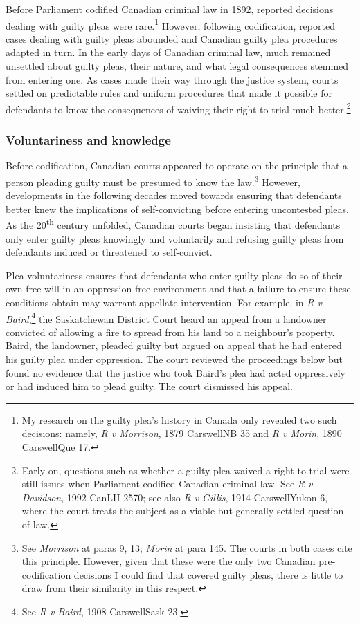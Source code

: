 Before Parliament codified Canadian criminal law in 1892, reported decisions dealing with guilty pleas were rare.\footnote{My research on the guilty plea's history in Canada only revealed two such decisions: namely, \textit{R v Morrison}, 1879 CarswellNB 35 and \textit{R v Morin}, 1890 CarswellQue 17.} However, following codification, reported cases dealing with guilty pleas abounded and Canadian guilty plea procedures adapted in turn. In the early days of Canadian criminal law, much remained unsettled about guilty pleas, their nature, and what legal consequences stemmed from entering one. As cases made their way through the justice system, courts settled on predictable rules and uniform procedures that made it possible for defendants to know the consequences of waiving their right to trial much better.\footnote{Early on, questions such as whether a guilty plea waived a right to trial were still issues when Parliament codified Canadian criminal law. See \textit{R v Davidson}, 1992 CanLII 2570; see also \textit{R v Gillis}, 1914 CarswellYukon 6, where the court treats the subject as a viable but generally settled question of law.}

\subsubsection{Voluntariness and knowledge}

Before codification, Canadian courts appeared to operate on the principle that a person pleading guilty must be presumed to know the law.\footnote{See \textit{Morrison} at paras 9, 13; \textit{Morin} at para 145. The courts in both cases cite this principle. However, given that these were the only two Canadian pre-codification decisions I could find that covered guilty pleas, there is little to draw from their similarity in this respect.} However, developments in the following decades moved towards ensuring that defendants better knew the implications of self-convicting before entering uncontested pleas. As the 20\textsuperscript{th} century unfolded, Canadian courts began insisting that defendants only enter guilty pleas knowingly and voluntarily and refusing guilty pleas from defendants induced or threatened to self-convict.

Plea voluntariness ensures that defendants who enter guilty pleas do so of their own free will in an oppression-free environment and that a failure to ensure these conditions obtain may warrant appellate intervention. For example, in \textit{R v Baird},\footnote{See \textit{R v Baird}, 1908 CarswellSask 23.} the Saskatchewan District Court heard an appeal from a landowner convicted of allowing a fire to spread from his land to a neighbour's property. Baird, the landowner, pleaded guilty but argued on appeal that he had entered his guilty plea under oppression. The court reviewed the proceedings below but found no evidence that the justice who took Baird's plea had acted oppressively or had induced him to plead guilty. The court dismissed his appeal. 


